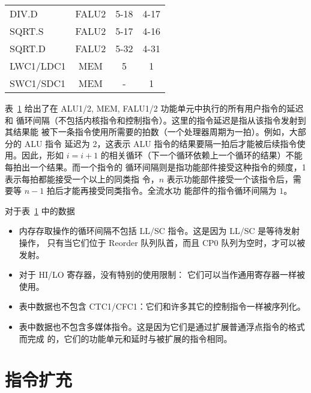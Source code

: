 \begin{table}[htbp]
\begin{tabular}{|l|c|c|c|}
    DIV.D                              & FALU2   & 5-18 & 4-17   \\ 
    SQRT.S                             & FALU2   & 5-17 & 4-16   \\ 
    SQRT.D                             & FALU2   & 5-32 & 4-31   \\ 
    LWC1/LDC1                          & MEM     & 5    & 1      \\ 
    SWC1/SDC1                          & MEM     & -    & 1      \\ \hline
  \end{tabular}
  \caption{}
  \label{tab:instr-delay}
\end{table}

表~\ref{tab:instr-delay} 给出了在 ALU1/2, MEM, FALU1/2 功能单元中执行的所有用户指令的延迟和
循环间隔（不包括内核指令和控制指令）。这里的指令延迟是指从该指令发射到其结果能
被下一条指令使用所需要的拍数（一个处理器周期为一拍）。例如，大部分的 ALU 指令
延迟为 2，这表示 ALU 指令的结果要隔一拍后才能被后续指令使用。因此，形如 $i = i + 1$
的相关循环（下一个循环依赖上一个循环的结果）不能每拍出一个结果。而一个指令的
循环间隔则是指功能部件接受这种指令的频度，1 表示每拍都能接受一个以上的同类指
令，$n$ 表示功能部件接受一个该指令后，需要等 $n-1$
拍后才能再接受同类指令。全流水功 能部件的指令循环间隔为 $1$。

\noindent 对于表~\ref{tab:instr-delay} 中的数据
\begin{itemize}
  \item 内存存取操作的循环间隔不包括 LL/SC 指令。这是因为 LL/SC
    是等待发射操作， 只有当它们位于 Reorder 队列队首，而且 CP0
    队列为空时，才可以被发射。
  \item 对于 HI/LO 寄存器，没有特别的使用限制： 它们可以当作通用寄存器一样被使用。
  \item 表中数据也不包含 CTC1/CFC1：它们和许多其它的控制指令一样被序列化。
  \item 表中数据也不包含多媒体指令。这是因为它们是通过扩展普通浮点指令的格式而完成
    的，它们的功能单元和延时与被扩展的指令相同。
\end{itemize}

\section{指令扩充}

